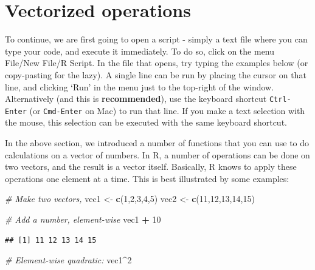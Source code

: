 \documentclass[]{book}
\newenvironment{Shaded}{\begin{snugshade}}{\end{snugshade}}
\newcommand{\CommentTok}[1]{\textcolor[rgb]{0.56,0.35,0.01}{\textit{#1}}}
\newcommand{\DecValTok}[1]{\textcolor[rgb]{0.00,0.00,0.81}{#1}}
\newcommand{\KeywordTok}[1]{\textcolor[rgb]{0.13,0.29,0.53}{\textbf{#1}}}
\newcommand{\NormalTok}[1]{#1}
\newcommand{\OperatorTok}[1]{\textcolor[rgb]{0.81,0.36,0.00}{\textbf{#1}}}
\newcommand{\StringTok}[1]{\textcolor[rgb]{0.31,0.60,0.02}{#1}}
\begin{document}
\hypertarget{vectorized}{%
\section{Vectorized operations}\label{vectorized}}

To continue, we are first going to open a script - simply a text file where you can type your code, and execute it immediately. To do so, click on the menu File/New File/R Script. In the file that opens, try typing the examples below (or copy-pasting for the lazy). A single line can be run by placing the cursor on that line, and clicking `Run' in the menu just to the top-right of the window. Alternatively (and this is \textbf{recommended}), use the keyboard shortcut \texttt{Ctrl-Enter} (or \texttt{Cmd-Enter} on Mac) to run that line. If you make a text selection with the mouse, this selection can be executed with the same keyboard shortcut.

In the above section, we introduced a number of functions that you can use to do calculations on a vector of numbers. In R, a number of operations can be done on two vectors, and the result is a vector itself. Basically, R knows to apply these operations one element at a time. This is best illustrated by some examples:

\begin{Shaded}
\begin{Highlighting}[]
\CommentTok{# Make two vectors,}
\NormalTok{vec1 <-}\StringTok{ }\KeywordTok{c}\NormalTok{(}\DecValTok{1}\NormalTok{,}\DecValTok{2}\NormalTok{,}\DecValTok{3}\NormalTok{,}\DecValTok{4}\NormalTok{,}\DecValTok{5}\NormalTok{)}
\NormalTok{vec2 <-}\StringTok{ }\KeywordTok{c}\NormalTok{(}\DecValTok{11}\NormalTok{,}\DecValTok{12}\NormalTok{,}\DecValTok{13}\NormalTok{,}\DecValTok{14}\NormalTok{,}\DecValTok{15}\NormalTok{)}

\CommentTok{# Add a number, element-wise}
\NormalTok{vec1 }\OperatorTok{+}\StringTok{ }\DecValTok{10}
\end{Highlighting}
\end{Shaded}

\begin{verbatim}
## [1] 11 12 13 14 15
\end{verbatim}

\begin{Shaded}
\begin{Highlighting}[]
\CommentTok{# Element-wise quadratic:}
\NormalTok{vec1}\OperatorTok{^}\DecValTok{2}
\end{Highlighting}
\end{Shaded}
\end{document}
